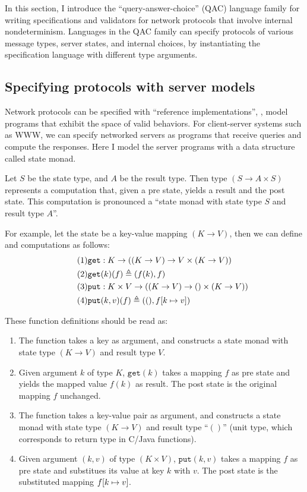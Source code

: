 In this section, I introduce the ``query-answer-choice'' (QAC) language family
for writing specifications and validators for network protocols that involve
internal nondeterminism.  Languages in the QAC family can specify protocols of
various message types, server states, and internal choices, by instantiating the
specification language with different type arguments.

\subsection{Specifying protocols with server models}
\label{sec:qac-model}
Network protocols can be specified with ``reference implementations'', \ie,
model programs that exhibit the space of valid behaviors.  For client-server
systems such as WWW, we can specify networked servers as programs that receive
queries and compute the responses.  Here I model the server programs with a data
structure called state monad.

\begin{definition}
  Let $S$ be the state type, and $A$ be the result type.  Then type $(S\to
  A\times S)$ represents a computation that, given a pre state, yields a result
  and the post state.  This computation is pronounced a ``state monad with state
  type $S$ and result type $A$''.

  For example, let the state be a key-value mapping $(K\to V)$, then we can
  define  and  computations as follows:
  \begin{align}
    \tag{1}&\mathtt{get}:K\to((K\to V)\to V\times(K\to V))\\
    \tag{2}&\mathtt{get}(k)(f)\triangleq (f(k), f)\\
    \tag{3}&\mathtt{put}:K\times V\to((K\to V)\to ()\times(K\to V))\\
    \tag{4}&\mathtt{put}(k,v)(f)\triangleq((),f[k\mapsto v])
  \end{align}

  These function definitions should be read as:
  \begin{enumerate}
    \item The  function takes a key as argument, and constructs a
      state monad with state type $(K\to V)$ and result type $V$.
    \item Given argument $k$ of type $K$, $\mathtt{get}(k)$ takes a mapping $f$
      as pre state and yields the mapped value $f(k)$ as result.  The post state
      is the original mapping $f$ unchanged.
    \item The  function takes a key-value pair as argument, and
      constructs a state monad with state type $(K\to V)$ and result type
      ``$()$'' (unit type, which corresponds to  return type in
      C/Java functions).
    \item Given argument $(k,v)$ of type $(K\times V)$, $\mathtt{put}(k,v)$
      takes a mapping $f$ as pre state and substitues its value at key $k$ with
      $v$.  The post state is the substituted mapping $f[k\mapsto v]$.
  \end{enumerate}
\end{definition}

